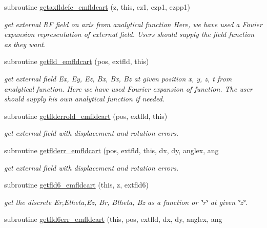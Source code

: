 \begin{DoxyCompactItemize}
subroutine \mbox{\hyperlink{namespaceemfldcartclass_abe4d0916e2997f8145abad1eb026ea9d}{getaxfldefc\+\_\+emfldcart}} (z, this, ez1, ezp1, ezpp1)
\begin{DoxyCompactList}\small\item\em get external RF field on axis from analytical function Here, we have used a Fouier expansion representation of external field. Users should supply the field function as they want. \end{DoxyCompactList}\item 
subroutine \mbox{\hyperlink{namespaceemfldcartclass_a77a88279f5b3f9878199cf20d7e4c5a5}{getfld\+\_\+emfldcart}} (pos, extfld, this)
\begin{DoxyCompactList}\small\item\em get external field Ex, Ey, Ez, Bx, Bx, Bz at given position x, y, z, t from analytical function. Here we have used Fourier expansion of function. The user should supply his own analytical function if needed. \end{DoxyCompactList}\item 
subroutine \mbox{\hyperlink{namespaceemfldcartclass_a8ab65fe6671e5e09361a2d44930aa93a}{getflderrold\+\_\+emfldcart}} (pos, extfld, this)
\begin{DoxyCompactList}\small\item\em get external field with displacement and rotation errors. \end{DoxyCompactList}\item 
subroutine \mbox{\hyperlink{namespaceemfldcartclass_a4c48df0aca1d75a2301a87c5b1c0304d}{getflderr\+\_\+emfldcart}} (pos, extfld, this, dx, dy, anglex, ang
\begin{DoxyCompactList}\small\item\em get external field with displacement and rotation errors. \end{DoxyCompactList}\item 
subroutine \mbox{\hyperlink{namespaceemfldcartclass_a099681f57177c62b1715bde0b0fe93bb}{getfld6\+\_\+emfldcart}} (this, z, extfld6)
\begin{DoxyCompactList}\small\item\em get the discrete Er,Etheta,Ez, Br, Btheta, Bz as a function or \char`\"{}r\char`\"{} at given \char`\"{}z\char`\"{}. \end{DoxyCompactList}\item 
subroutine \mbox{\hyperlink{namespaceemfldcartclass_a1b849dab96a221608dde6ea08028e459}{getfld6err\+\_\+emfldcart}} (this, pos, extfld, dx, dy, anglex, ang

\end{DoxyCompactItemize}
